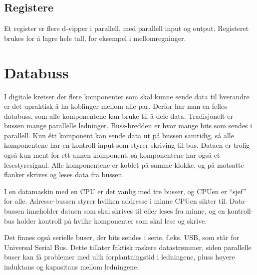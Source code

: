\documentclass[12pt,a4paper,norsk]{article}
\begin{document}
\subsection{Registere}
Et register er flere d-vipper i parallell, med parallell input og output.
Registeret brukes for å lagre hele tall, for eksempel i mellomregninger.

\section{Databuss}
I digitale kretser der flere komponenter som skal kunne sende data til hverandre
er det upraktisk å ha koblinger mellom alle par. Derfor har man en felles
databuss, som alle komponentene kan bruke til å dele data. Tradisjonelt er
bussen mange parallelle ledninger. Buss-bredden er hvor mange bits som sendes i
parallell. Kun étt komponent kan sende data ut på bussen samtidig, så alle
komponentene har en kontroll-input som styrer skriving til bus. Dataen er trolig
også kun ment for ett annen komponent, så komponentene har også et
lesestyresignal. Alle komponentene er koblet på samme klokke, og på motsatte
flanker skrives og leses data fra bussen.

I en datamaskin med en CPU er det vanlig med tre busser, og CPUen er ``sjef''
for alle. Adresse-bussen styrer hvilken addresse i minne CPUen sikter til.
Data-bussen inneholder dataen som skal skrives til eller leses fra minne, og en
kontroll-bus holder kontroll på hvilke komponenter som skal lese og skrive.

Det finnes også serielle buser, der bits sendes i serie, f.eks. USB, som står
for Universal Serial Bus. Dette tillater faktisk raskere datastrømmer, siden
parallelle buser kan få problemer med ulik forplantningstid i ledningene, pluss
høyere induktans og kapasitans mellom ledningene.
\end{document}
